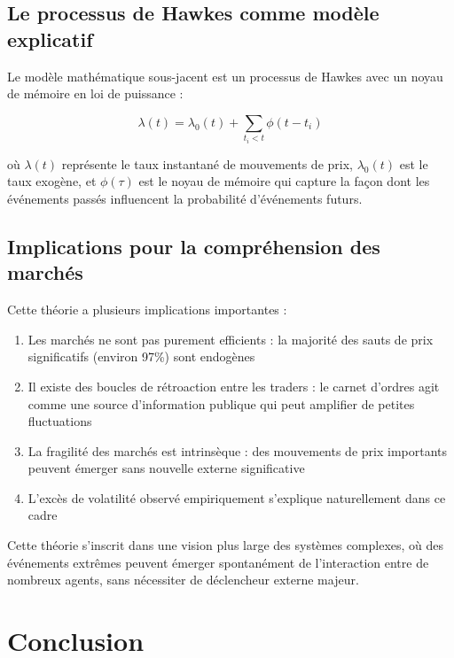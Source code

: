 \documentclass[10pt,a4paper]{article}
\theoremstyle{definition}
\theoremstyle{remark}
\begin{document}
\begin{itemize}
\subsection{Le processus de Hawkes comme modèle explicatif}

Le modèle mathématique sous-jacent est un processus de Hawkes avec un noyau de mémoire en loi de puissance :

\begin{equation}
\lambda(t) = \lambda_0(t) + \sum_{t_i < t} \phi(t-t_i)
\end{equation}

où $\lambda(t)$ représente le taux instantané de mouvements de prix, $\lambda_0(t)$ est le taux exogène, et $\phi(\tau)$ est le noyau de mémoire qui capture la façon dont les événements passés influencent la probabilité d'événements futurs.

\subsection{Implications pour la compréhension des marchés}

Cette théorie a plusieurs implications importantes :

\begin{enumerate}
    \item Les marchés ne sont pas purement efficients : la majorité des sauts de prix significatifs (environ 97\%) sont endogènes
    \item Il existe des boucles de rétroaction entre les traders : le carnet d'ordres agit comme une source d'information publique qui peut amplifier de petites fluctuations
    \item La fragilité des marchés est intrinsèque : des mouvements de prix importants peuvent émerger sans nouvelle externe significative
    \item L'excès de volatilité observé empiriquement s'explique naturellement dans ce cadre
\end{enumerate}

Cette théorie s'inscrit dans une vision plus large des systèmes complexes, où des événements extrêmes peuvent émerger spontanément de l'interaction entre de nombreux agents, sans nécessiter de déclencheur externe majeur.

\newpage
\section*{Conclusion}


\end{itemize}
\end{document}
